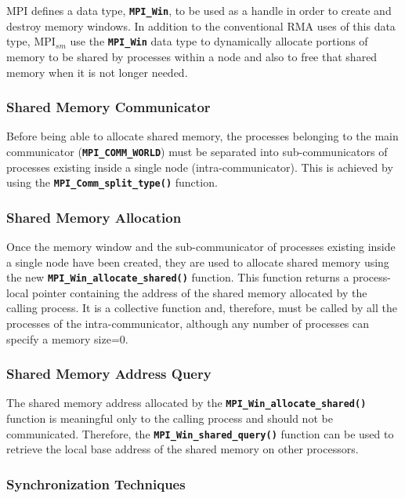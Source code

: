 MPI defines a data type, \textbf{\texttt{MPI\_Win}}, to be used as a handle in order to create and destroy memory windows. In addition to the conventional RMA uses of this data type, MPI$_{sm}$ use the \textbf{\texttt{MPI\_Win}} data type to dynamically allocate portions of memory to be shared by processes within a node and also to free that shared memory when it is not longer needed.


\subsubsection*{Shared Memory Communicator}

Before being able to allocate shared memory, the processes belonging to the main communicator (\textbf{\texttt{MPI\_COMM\_WORLD}}) must be separated into sub-communicators of processes existing inside a single node (intra-communicator). This is achieved by using the \textbf{\texttt{MPI\_Comm\_split\_type()}} function.


\subsubsection*{Shared Memory Allocation}

Once the memory window and the sub-communicator of processes existing inside a single node have been created, they are used to allocate shared memory using the new \textbf{\texttt{MPI\_Win\_allocate\_shared()}} function. This function returns a process-local pointer containing the address of the shared memory allocated by the calling process. It is a collective function and, therefore, must be called by all the processes of the intra-communicator, although any number of processes can specify a memory size=0.

\subsubsection*{Shared Memory Address Query}

The shared memory address allocated by the \textbf{\texttt{MPI\_Win\_allocate\_shared()}} function is meaningful only to the calling process and should not be communicated. Therefore, the \textbf{\texttt{MPI\_Win\_shared\_query()}} function can be used to retrieve the local base address of the shared memory on other processors.


\subsubsection*{Synchronization Techniques}

